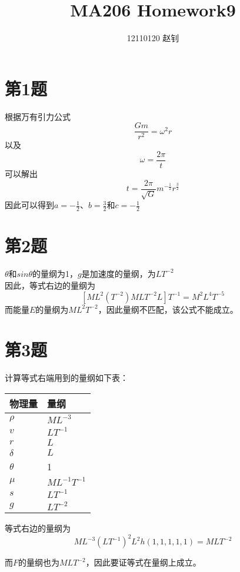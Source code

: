 \documentclass{article}
\title{MA206 Homework9}
\author{12110120 赵钊}
\date{}
\begin{document}
\maketitle


\section{第1题}
根据万有引力公式
\[\frac{Gm}{r^2} = \omega^2 r\]
以及
\[\omega = \frac{2\pi}{t}\]
可以解出
\[t = \frac{2\pi}{\sqrt{G}} m^{-\frac{1}{2}} r^\frac{3}{2}\]
因此可以得到$a = -\frac{1}{2}$、$b = \frac{3}{2}$和$c = -\frac{1}{2}$

\section{第2题}
$\theta$和$sin\theta$的量纲为1，$g$是加速度的量纲，为$LT^{-2}$ \\
因此，等式右边的量纲为
\[\left[ ML^2\left(T^{-2}\right)MLT^{-2}L \right] T^{-1} = M^2L^4T^{-5}\]
而能量$E$的量纲为$ML^2T^{-2}$，因此量纲不匹配，该公式不能成立。

\section{第3题}
计算等式右端用到的量纲如下表：
\begin{table}[!ht]
    \centering
    \begin{tabular}{|l|l|}
    \hline
        物理量 & 量纲 \\ \hline
        $\rho$ & $ML^{-3}$ \\ \hline
        $v$ & $LT^{-1}$ \\ \hline
        $r$ & $L$ \\ \hline
        $\delta$ & $L$ \\ \hline
        $\theta$ & 1 \\ \hline
        $\mu$ & $ML^{-1}T^{-1}$ \\ \hline
        $s$ & $LT^{-1}$ \\ \hline
        $g$ & $LT^{-2}$ \\ \hline
    \end{tabular}
\end{table}

\newpage

等式右边的量纲为
\[ML^{-3}(LT^{-1})^2L^2h(1,1,1,1,1) = MLT^{-2}\]

而$F$的量纲也为$MLT^{-2}$，因此要证等式在量纲上成立。
\end{document}
